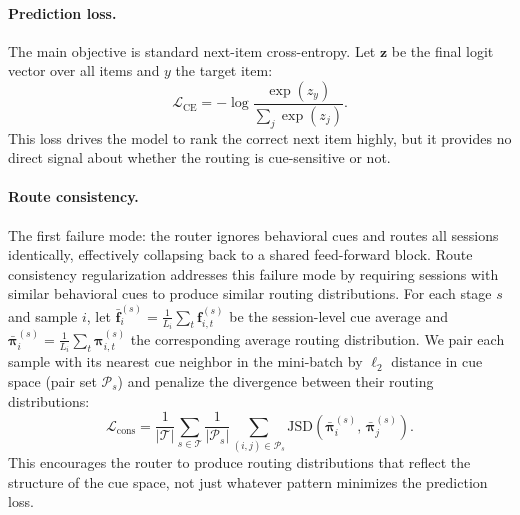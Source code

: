 \documentclass[sigconf,review,anonymous]{acmart}
\begin{document}
\paragraph{Prediction loss.}
The main objective is standard next-item cross-entropy. Let $\mathbf{z}$ be the final logit vector over all items and $y$ the target item:
\[
\mathcal{L}_{\mathrm{CE}} = -\log \frac{\exp(z_y)}{\sum_{j}\exp(z_j)}.
\]
This loss drives the model to rank the correct next item highly, but it provides no direct signal about whether the routing is cue-sensitive or not.

\paragraph{Route consistency.}
The first failure mode: the router ignores behavioral cues and routes all sessions identically, effectively collapsing back to a shared feed-forward block. Route consistency regularization addresses this failure mode by requiring sessions with similar behavioral cues to produce similar routing distributions. For each stage $s$ and sample $i$, let $\bar{\mathbf{f}}^{(s)}_i = \frac{1}{L_i}\sum_t\mathbf{f}^{(s)}_{i,t}$ be the session-level cue average and $\bar{\boldsymbol{\pi}}^{(s)}_i = \frac{1}{L_i}\sum_t\boldsymbol{\pi}^{(s)}_{i,t}$ the corresponding average routing distribution. We pair each sample with its nearest cue neighbor in the mini-batch by $\ell_2$ distance in cue space (pair set $\mathcal{P}_s$) and penalize the divergence between their routing distributions:
\[
\mathcal{L}_{\mathrm{cons}}
=
\frac{1}{|\mathcal{T}|}
\sum_{s \in \mathcal{T}}
\frac{1}{|\mathcal{P}_s|}
\sum_{(i,j)\in \mathcal{P}_s}
\mathrm{JSD}\!\left(\bar{\boldsymbol{\pi}}^{(s)}_i,\,\bar{\boldsymbol{\pi}}^{(s)}_j\right).
\]
This encourages the router to produce routing distributions that reflect the structure of the cue space, not just whatever pattern minimizes the prediction loss.
\end{document}

